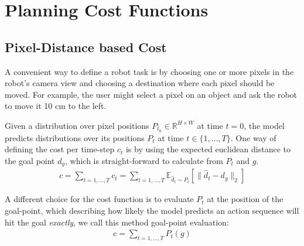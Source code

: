 \section{Planning Cost Functions}
\label{sec:cost}


\subsection{Pixel-Distance based Cost}
\label{subsec:pixel_dist_cost}
A convenient way to define a robot task is by choosing one or more pixels in the robot's camera view and choosing a destination where each pixel should be moved. For example, the user might select a pixel on an object and ask the robot to move it 10 cm to the left.

 
Given a distribution over pixel positions $P_{t_0}\in\mathbb{R}^{H\times W}$ at time $t = 0$, the model predicts distributions over its positions $P_t$ at time $t \in \{ 1, \dots, T \}$. One way of defining the cost per time-step $c_t$ is by using the expected euclidean distance to the goal point $d_g$, which is straight-forward to calculate from $P_t$ and $g$. 
 \begin{align}
c = \sum_{t = 1, \dots, T} c_t =  \sum_{t = 1, \dots, T} \mathbb{E}_{\hat{d}_{t} \sim P_{t}} \left[\|\hat{d}_{t} - d_{g}\|_2\right] 
 \label{eq:cost}
 \end{align}
 
A different choice for the cost function is to evaluate $P_{t}$ at the position of the goal-point, which describing how likely the model predicts an action sequence will hit the goal \emph{exactly}, we call this method goal-point evaluation:
 \begin{align}
 c = \sum_{t = 1, \dots, T} P_t(g)
 \label{eq:goal_point_eval}
 \end{align}
 
